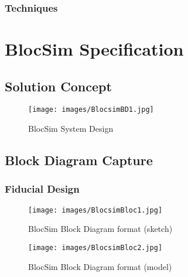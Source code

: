 \subsection{Techniques}







\chapter{BlocSim Specification}
\label{ch:spec}



\section{Solution Concept}

\begin{figure}[ht!]
\centering
\texttt{[image: images/BlocsimBD1.jpg]}
\caption{BlocSim System Design \cite{blocsimPoster}}
\label{im:BlocsimBD1}
\end{figure}

\clearpage



\section{Block Diagram Capture}



\subsection{Fiducial Design}




\begin{figure}[ht!]
\centering
\texttt{[image: images/BlocsimBloc1.jpg]}
\caption{BlocSim Block Diagram format (sketch)}
\label{im:BlocsimBD1}
\end{figure}

\begin{figure}[ht!]
\centering
\texttt{[image: images/BlocsimBloc2.jpg]}
\caption{BlocSim Block Diagram format (model)}
\label{im:BlocsimBD2}
\end{figure}

